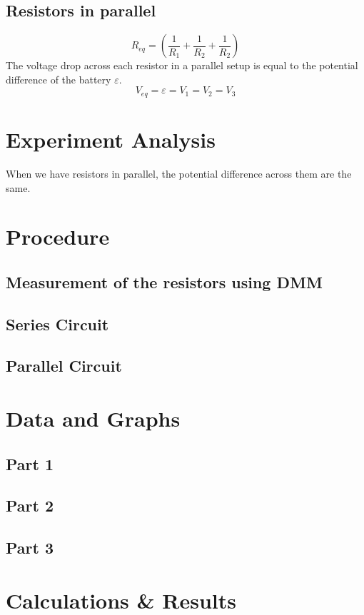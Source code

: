 \documentclass[titlepage]{article}
\begin{document}
    \subsection*{Resistors in parallel} 
        $$R_{eq} = \left( \frac{1}{R_1} + \frac{1}{R_2} + \frac{1}{R_2} \right)  $$
        The voltage drop across each resistor in a parallel setup is equal to the potential difference of the battery $\varepsilon$.
        $$V_{eq} = \varepsilon = V_1 = V_2 = V_3 $$


	\section{Experiment Analysis}
    When we have resistors in parallel, the potential difference across them are the same. 
    



	\section{Procedure}
        \subsection{Measurement of the resistors using DMM}
        \subsection{Series Circuit}
        \subsection{Parallel Circuit}




	\section{Data and Graphs}
	\subsection{Part 1}
	\subsection{Part 2} 
	\subsection{Part 3}
    \section{Calculations \& Results}
\end{document}
